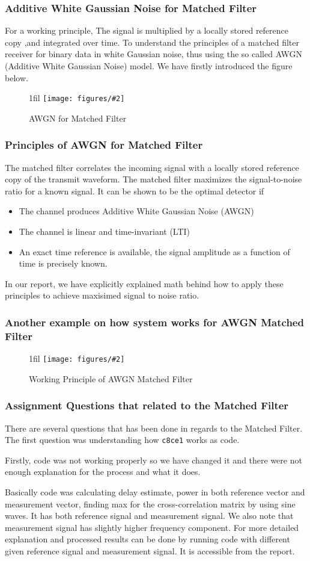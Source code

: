 \documentclass{beamer}
\makeatletter
\newcommand{\code}[1]{\texttt{#1}}
\newcommand*{\centerfloat}{%
  \parindent \z@
  \leftskip \z@ \@plus 1fil \@minus \textwidth
  \rightskip\leftskip
  \parfillskip \z@skip}
\newcommand{\fig}[3]{
  \begin{figure}[H]
  \centerfloat
    \texttt{[image: figures/\#2]}
    \caption{#3}
  \end{figure}
}
\makeatother
\begin{document}
\begin{frame}
	\frametitle{Additive White Gaussian Noise for Matched Filter}
For a working principle, The signal is multiplied by a locally stored reference copy ,and integrated over time.
To understand the principles of a matched filter receiver for binary data in white Gaussian noise, thus using the so called AWGN (Additive White Gaussian Noise) model. We have firstly introduced the figure below.
\fig{5cm}{figure_31.png}{AWGN for Matched Filter}
\end{frame}

\begin{frame}
	\frametitle{Principles of AWGN for Matched Filter}
The matched filter correlates the incoming signal with a locally stored reference copy of the transmit waveform. The matched filter maximizes the signal-to-noise ratio for a known signal. It can be shown to be the optimal detector if
\begin{itemize}
	\item The channel produces Additive White Gaussian Noise (AWGN)
	\item The channel is linear and time-invariant (LTI)
	\item An exact time reference is available, the signal amplitude as a function of time is precisely known.
\end{itemize}
In our report, we have explicitly explained math behind how to apply these principles to achieve maxisimed signal to noise ratio.
\end{frame}

\begin{frame}
	\frametitle{Another example on how system works for AWGN Matched Filter}
	\fig{5cm}{working_principle_mf.png} {Working Principle of AWGN Matched Filter}
\end{frame}
\begin{frame}
	\frametitle{Assignment Questions that related to the Matched Filter}
There are several questions that has been done in regards to the Matched Filter. The first question was understanding how \code{c8ce1} works as code.

Firstly, code was not working properly so we have changed it and there were not enough explanation for the process and what it does.

Basically code was calculating delay estimate, power in both reference vector and measurement vector, finding max for the cross-correlation matrix by using sine waves. It has both reference signal and measurement signal. We also note that measurement signal has slightly higher frequency component. For more detailed explanation and processed results can be done by running code with different given reference signal and measurement signal. It is accessible from the report.
\end{frame}
\end{document}
